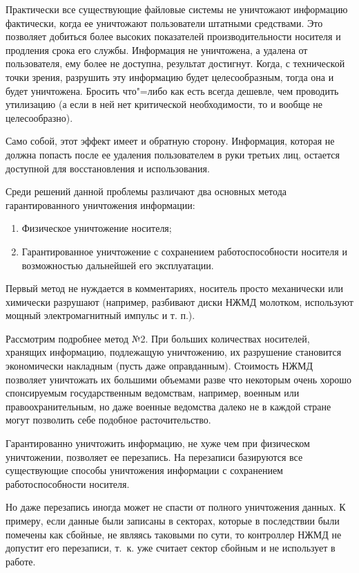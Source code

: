 \documentclass[10pt, a5paper]{article}
\begin{document}
Практически все существующие файловые системы не уничтожают информацию фактически, когда ее уничтожают пользователи  штатными средствами. Это позволяет добиться более высоких показателей производительности носителя и продления срока его службы. Информация не уничтожена, а удалена от пользователя, ему более не доступна, результат достигнут. Когда, с технической точки зрения, разрушить эту информацию будет целесообразным, тогда она и будет уничтожена. Бросить что"=либо как есть всегда дешевле, чем проводить утилизацию (а если в ней нет критической необходимости, то и вообще не целесообразно).

Само собой, этот эффект имеет и обратную сторону.  Информация, которая не должна попасть после ее удаления пользователем в руки третьих лиц, остается доступной для восстановления и использования.

Среди решений данной проблемы различают два основных метода гарантированного уничтожения информации:
\begin{enumerate}
      \item Физическое уничтожение носителя;
      \item Гарантированное уничтожение с сохранением работоспособности носителя и возможностью дальнейшей его эксплуатации.
\end{enumerate}

Первый метод не нуждается в комментариях, носитель просто механически или химически разрушают (например, разбивают диски НЖМД молотком, используют мощный электромагнитный импульс и т. п.).

Рассмотрим подробнее метод №2. При больших количествах носителей, хранящих информацию, подлежащую уничтожению, их разрушение становится экономически накладным (пусть даже оправданным). Стоимость НЖМД позволяет уничтожать их большими объемами разве что некоторым очень хорошо спонсируемым государственным ведомствам, например, военным или правоохранительным, но даже военные ведомства далеко не в каждой стране могут позволить себе подобное расточительство.

Гарантированно уничтожить информацию, не хуже чем при физическом уничтожении, позволяет ее перезапись. На перезаписи базируются все существующие способы уничтожения информации с сохранением работоспособности носителя.

Но даже перезапись иногда может не спасти от полного уничтожения данных. К примеру, если данные были записаны в секторах, которые в последствии были помечены как сбойные, не являясь таковыми по сути, то контроллер НЖМД не допустит его перезаписи, т.~к. уже считает сектор сбойным и не использует в работе.
\end{document}
